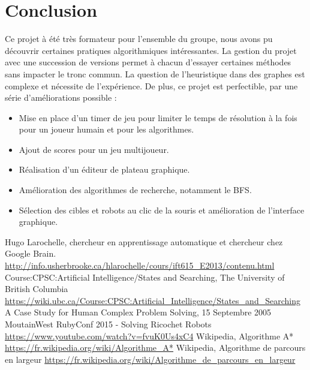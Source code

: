 \documentclass[a4paper]{article} %
\begin{document}
\section{Conclusion}
Ce projet à été très formateur pour l'ensemble du groupe, nous avons pu découvrir certaines pratiques algorithmiques intéressantes. La gestion du projet avec une succession de versions permet à chacun d'essayer certaines méthodes sans impacter le tronc commun. La question de l'heuristique dans des graphes est complexe et nécessite de l'expérience. De plus, ce projet est perfectible, par une série d'améliorations possible :
\begin{itemize}
\item Mise en place d'un timer de jeu pour limiter le temps de résolution à la fois pour un joueur humain et pour les algorithmes.
\item Ajout de scores pour un jeu multijoueur.
\item Réalisation d'un éditeur de plateau graphique.
\item Amélioration des algorithmes de recherche, notamment le BFS.
\item Sélection des cibles et robots au clic de la souris et amélioration de l'interface graphique.
\end{itemize}

\begin{thebibliography}{9}
 Hugo Larochelle, chercheur en apprentissage automatique et chercheur chez Google Brain. \url{http://info.usherbrooke.ca/hlarochelle/cours/ift615_E2013/contenu.html}
 Course:CPSC:Artificial Intelligence/States and Searching, The University of British Columbia \url{https://wiki.ubc.ca/Course:CPSC:Artificial_Intelligence/States_and_Searching}
 A Case Study for Human Complex Problem Solving, 15 Septembre 2005
 MoutainWest RubyConf 2015 - Solving Ricochet Robots \url{https://www.youtube.com/watch?v=fvuK0Us4xC4}
 Wikipedia, Algorithme A* \url{https://fr.wikipedia.org/wiki/Algorithme_A*}
 Wikipedia, Algorithme de parcours en largeur \url{https://fr.wikipedia.org/wiki/Algorithme_de_parcours_en_largeur}
\end{thebibliography}
\end{document}
